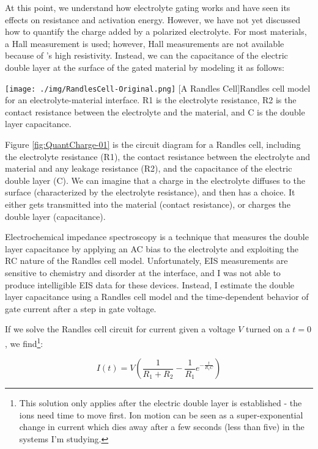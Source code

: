 At this point, we understand how electrolyte gating works and have seen its effects on resistance and activation energy. However, we have not yet discussed how to quantify the charge added by a polarized electrolyte. For most materials, a Hall measurement is used; however, Hall measurements are not available because of \ruclnospace 's high resistivity. Instead, we can the capacitance of the electric double layer at the surface of the gated material by modeling it as follows:

\begin{centering}
\texttt{[image: ./img/RandlesCell-Original.png]}
  \captionsetup{width=0.75\textwidth}
  [A Randles Cell]{Randles cell model for an electrolyte-material interface. R1 is the electrolyte resistance, R2 is the contact resistance between the electrolyte and the material, and C is the double layer capacitance.} 
  \label{fig:QuantCharge-01}
\end{centering}

Figure \ref{fig:QuantCharge-01} is the circuit diagram for a Randles cell, including the electrolyte resistance (R1), the contact resistance between the electrolyte and material and any leakage resistance (R2), and the capacitance of the electric double layer (C). We can imagine that a charge in the electrolyte diffuses to the surface (characterized by the electrolyte resistance), and then has a choice. It either gets transmitted into the material (contact resistance), or charges the double layer (capacitance). 

Electrochemical impedance spectroscopy is a technique that measures the double layer capacitance by applying an AC bias to the electrolyte and exploiting the RC nature of the Randles cell model. Unfortunately, EIS measurements are sensitive to chemistry and disorder at the interface, and I was not able to produce intelligible EIS data for these devices. Instead, I estimate the double layer capacitance using a Randles cell model and the time-dependent behavior of gate current after a step in gate voltage.

If we solve the Randles cell circuit for current given a voltage $V$ turned on a $t = 0$, we find\footnote{This solution only applies after the electric double layer is established - the ions need time to move first. Ion motion can be seen as a super-exponential change in current which dies away after a few seconds (less than five) in the systems I'm studying.}:

\begin{equation}
I(t) = V \left(\frac{1}{R_{1} + R_{2}} - \frac{1}{R_{1}} e^{-\frac{t}{R_{1}C}} \right)
\end{equation}

